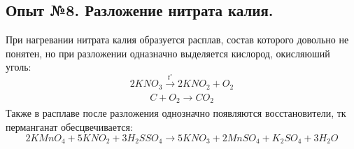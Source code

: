 \documentclass[a4paper,12pt]{article}
\begin{document}
 \subsection{Опыт №8. Разложение нитрата калия.}
 При нагревании нитрата калия образуется расплав, состав которого довольно не понятен, но при разложении одназначно выделяется кислород, окисляюший уголь:
 \begin{equation}
     2KNO_3 \xrightarrow[]{t^{\circ}} 2KNO_2 + O_2
 \end{equation}
 \begin{equation}
     C + O_2 \xrightarrow[]{} CO_2
 \end{equation}
 Также в расплаве после разложения однозначно появляются восстановители, тк перманганат обесцвечивается:
 \begin{equation}
     2KMnO_4 + 5KNO_2 + 3H_2SSO_4 \xrightarrow[]{} 5KNO_3 + 2MnSO_4 + K_2SO_4 + 3H_2O
 \end{equation}
\end{document}
